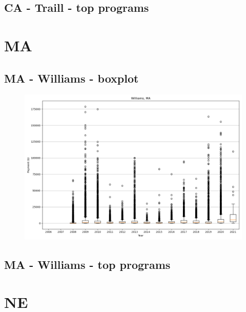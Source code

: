 \subsection*{CA - Traill - top programs}

\newpage
\section*{MA}
\subsection*{MA - Williams - boxplot}
\begin{figure}[h]
\centering
\includegraphics[width=7in]{../output/boxplots/counties/Williams-MA_boxplot.png}
\end{figure}


\subsection*{MA - Williams - top programs}

\newpage
\section*{NE}
